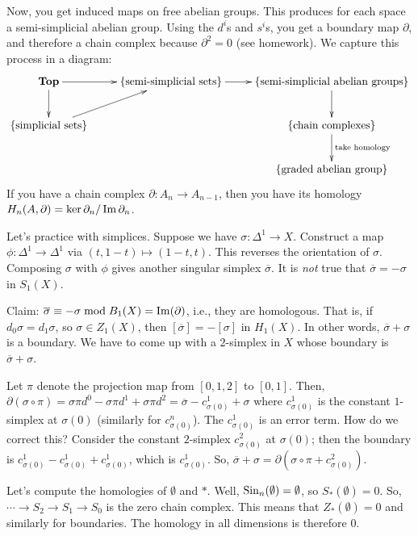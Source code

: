 Now, you get induced maps on free abelian groups. This produces for each space a semi-simplicial abelian group. Using the $d^i$s and $s^i$s, you get a boundary map $\partial$, and therefore a chain complex because $\partial^2=0$ (see homework). We capture this process in a diagram:
\begin{equation*}
\xymatrix{\mathbf{Top}\ar[d]\ar[r] & \{\text{semi-simplicial sets}\}\ar[r] & \{\text{semi-simplicial abelian groups}\}\ar[d]\\
    \{\text{simplicial sets}\}\ar[ur] & & \{\text{chain complexes}\}\ar[d]^{\text{take homology}}\\
 & &\{\text{graded abelian group}\}}
\end{equation*}
If you have a chain complex $\partial:A_n\to A_{n-1}$, then you have its homology $H_n(A,\partial)=\ker\partial_n/\operatorname{Im}\partial_n$.

Let's practice with simplices. Suppose we have $\sigma:\Delta^1\to X$. Construct a map $\phi:\Delta^1\to\Delta^1$ via $(t,1-t)\mapsto (1-t,t)$. This reverses the orientation of $\sigma$. Composing $\sigma$ with $\phi$ gives another singular simplex $\overline{\sigma}$. It is \textit{not} true that $\overline{\sigma}=-\sigma$ in $S_1(X)$.

Claim: $\overline{\sigma}\equiv -\sigma\bmod B_1(X)=\operatorname{Im}(\partial)$, i.e., they are homologous. That is, if $d_0\sigma=d_1\sigma$, so $\sigma\in Z_1(X)$, then $[\overline{\sigma}]=-[\sigma]$ in $ H_1(X)$. In other words, $\overline{\sigma}+\sigma$ is a boundary. We have to come up with a $2$-simplex in $X$ whose boundary is $\overline{\sigma}+\sigma$.

Let $\pi$ denote the projection map from $[0,1,2]$ to $[0,1]$. Then, $\partial(\sigma\circ\pi)=\sigma\pi d^0-\sigma\pi d^1 +\sigma\pi d^2=\overline{\sigma}-c^1_{\sigma(0)}+\sigma$ where $c^1_{\sigma(0)}$ is the constant $1$-simplex at $\sigma(0)$ (similarly for $c^n_{\sigma(0)}$). The $c^1_{\sigma(0)}$ is an error term. How do we correct this? Consider the constant $2$-simplex $c^2_{\sigma(0)}$ at $\sigma(0)$; then the boundary is $c^1_{\sigma(0)}-c^1_{\sigma(0)}+c^1_{\sigma(0)}$, which is $c^1_{\sigma(0)}$. So, $\overline{\sigma}+\sigma=\partial(\sigma\circ\pi + c^2_{\sigma(0)})$.

Let's compute the homologies of $\emptyset$ and $\ast$. Well, $\mathrm{Sin}_n(\emptyset)=\emptyset$, so $S_\ast(\emptyset)=0$. So, $\cdots\to S_2\to S_1\to S_0$ is the zero chain complex. This means that $Z_\ast(\emptyset)=0$ and similarly for boundaries. The homology in all dimensions is therefore $0$.

